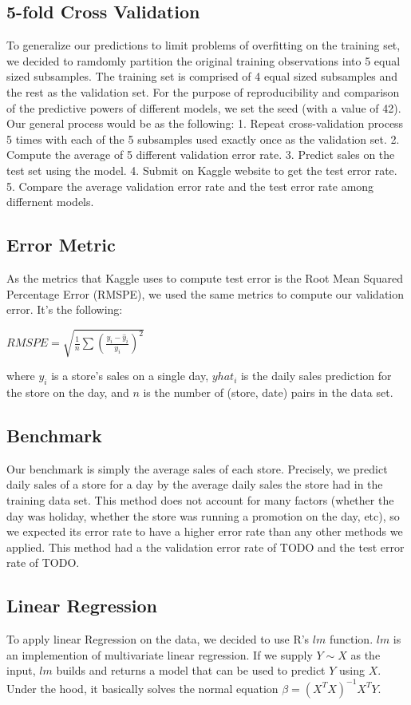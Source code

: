 \documentclass[letterpaper,twocolumn,10pt]{article}
\begin{document}
\subsection{5-fold Cross Validation} %
To generalize our predictions to limit problems of overfitting on the training set, we decided to ramdomly partition the original training observations into 5 equal sized subsamples. The training set is comprised of 4 equal sized subsamples and the rest as the validation set. For the purpose of reproducibility and comparison of the predictive powers of different models, we set the seed (with a value of 42). Our general process would be as the following:
1. Repeat cross-validation process 5 times with each of the 5 subsamples used exactly once as the validation set.
2. Compute the average of 5 different validation error rate. 
3. Predict sales on the test set using the model. 
4. Submit on Kaggle website to get the test error rate.
5. Compare the average validation error rate and the test error rate among differnent models.


\subsection{Error Metric}
As the metrics that Kaggle uses to compute test error is the Root Mean Squared Percentage Error (RMSPE), we used the same metrics to compute our validation error. It's the following:

$RMSPE = \sqrt{\frac{1}{n} \sum {(\frac{y_i - \hat y_i}{y_i})}^2}$

where ${y_i}$ is a store's sales on a single day, ${yhat_i}$ is the daily sales prediction for the store on the day, and ${n}$ is the number of (store, date) pairs in the data set. 

\subsection{Benchmark}
Our benchmark is simply the average sales of each store. Precisely, we predict daily sales of a store for a day by the average daily sales the store had in the training data set. This method does not account for many factors (whether the day was holiday, whether the store was running a promotion on the day, etc), so we expected its error rate to have a higher error rate than any other methods we applied. This method had a the validation error rate of TODO and the test error rate of TODO. 

\subsection{Linear Regression}
To apply linear Regression on the data, we decided to use R's $lm$ function. $lm$ is an implemention of multivariate linear regression. If we supply $Y \sim X$ as the input, $lm$ builds and returns a model that can be used to predict $Y$ using $X$. Under the hood, it basically solves the normal equation $\beta = (X^T X)^{-1} X^T Y$.
\end{document}
